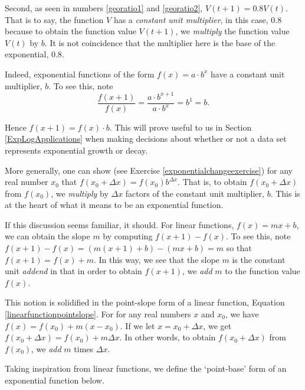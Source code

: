 \documentclass{ximera}
\begin{document}
{\smallskip

Second, as seen in numbers \ref{georatio1} and \ref{georatio2},  $V(t+1) = 0.8 V(t)$.  That is to say, the function $V$ has a \textit{constant unit multiplier}, in this case, $0.8$ because to obtain the function value $V(t+1)$, we \textit{multiply} the function value $V(t)$ by $b$.   It is not coincidence that the multiplier here is the base of the exponential, $0.8$.

\smallskip

Indeed, exponential functions of the form $f(x) = a \cdot b^{x}$  have a constant unit multiplier, $b$.  To see this,  note \[ \dfrac{f(x+1)}{f(x)} = \dfrac{a \cdot b^{x+1}}{ a \cdot b^{x}} = b^{1} = b.\]

Hence $f(x+1) = f(x) \cdot b$.  This will prove useful to us in Section \ref{ExpLogApplications} when making decisions about whether or not a data set represents exponential growth or decay.  

\smallskip

More generally, one can show (see Exercise \ref{exponentialchangeexercise}) for any real number $x_{0}$ that $f(x_{0}+\Delta x) = f(x_{0}) b^{\Delta x}$. That is, to obtain $f(x_{0} + \Delta x)$ from $f(x_{0})$, we \textit{multiply} by $\Delta x$ factors of the constant unit multiplier, $b$.  This is at the heart of what it means to be an exponential function.

\smallskip

If this discussion seems familiar, it should.  For linear functions, $f(x) = mx +b$, we can obtain the slope $m$ by computing $f(x+1) - f(x)$.  To see this, note $f(x+1) - f(x)  = (m(x+1) +b) - (mx+b) = m$ so that $f(x+1) = f(x) + m$.  In this way, we see that the slope $m$ is the constant unit \textit{addend} in that in order to obtain $f(x+1)$, we \textit{add} $m$ to the function value $f(x)$.  

\smallskip

This notion is solidified in the point-slope form of a linear function,  Equation \ref{linearfunctionpointslope}.  For for any real numbers $x$ and $x_{0}$, we have   $f(x) = f(x_{0}) + m(x-x_{0})$.  If we let $x = x_{0}+ \Delta x$, we get $f(x_{0}+ \Delta x) = f(x_{0}) + m \Delta x$.  In other words, to obtain $f(x_{0}+\Delta x)$ from $f(x_{0})$, we \textit{add} $m$ times $\Delta x$. 

\smallskip

Taking inspiration from linear functions, we define the `point-base' form of an exponential function below.

}
\end{document}
